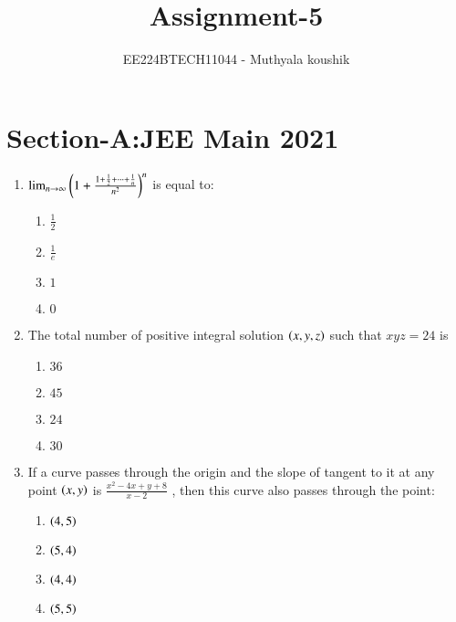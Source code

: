 \documentclass[journal,12pt,onecolumn]{IEEEtran}
\theoremstyle{remark}
\begin{document}

\vspace{3cm}

\title{Assignment-5}
\author{EE224BTECH11044 - Muthyala koushik
}
\maketitle
\bigskip

\renewcommand{\thefigure}{\theenumi}
\renewcommand{\thetable}{\theenumi}

\section{Section-A:JEE Main 2021}
\begin{enumerate}[start=16]
	\item $\lim_{n \to \infty}\left(1+\frac{1+\frac{1}{2}+\dots+\frac{1}{n}}{n^2}\right)^n$ is equal to:
		\begin{enumerate}
			\item $\frac{1}{2}$\\
			\item $\frac{1}{e}$\\
			\item $1$\\
			\item $0$
		\end{enumerate}
	\item The total number of positive integral solution $\left(x,y,z\right)$ such that $xyz = 24$ is 
		\begin{enumerate}
			\item $36$\\
			\item $45$\\
			\item $24$\\
			\item $30$
		\end{enumerate}
	\item If a curve passes through the origin and the slope of tangent to it at any point $\left(x,y\right)$ is $\frac{x^2-4x+y+8}{x-2}$ , then this curve also passes through the point:
		\begin{enumerate}
			\item $\left(4, 5\right)$\\
			\item $\left(5, 4\right)$\\
			\item $\left(4, 4\right)$\\
			\item $\left(5, 5\right)$

\end{enumerate}
\end{enumerate}
\end{document}
